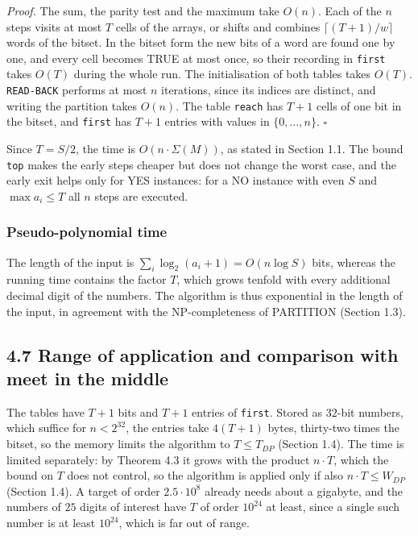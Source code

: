 \documentclass[
]{article}
\begin{document}
\emph{Proof.} The sum, the parity test and the maximum take \(O(n)\).
Each of the \(n\) steps visits at most \(T\) cells of the arrays, or
shifts and combines \(\lceil (T+1)/w \rceil\) words of the bitset. In
the bitset form the new bits of a word are found one by one, and every
cell becomes TRUE at most once, so their recording in \texttt{first}
takes \(O(T)\) during the whole run. The initialisation of both tables
takes \(O(T)\). \texttt{READ-BACK} performs at most \(n\) iterations,
since its indices are distinct, and writing the partition takes
\(O(n)\). The table \texttt{reach} has \(T + 1\) cells of one bit in the
bitset, and \texttt{first} has \(T + 1\) entries with values in
\(\lbrace 0, \dots, n \rbrace\). \(\square\)

Since \(T = S/2\), the time is \(O(n \cdot \Sigma(M))\), as stated in
Section 1.1. The bound \texttt{top} makes the early steps cheaper but
does not change the worst case, and the early exit helps only for YES
instances: for a NO instance with even \(S\) and \(\max a_i \le T\) all
\(n\) steps are executed.

\hypertarget{pseudo-polynomial-time}{%
\subsubsection{Pseudo-polynomial time}\label{pseudo-polynomial-time}}

The length of the input is \(\sum_i \log_2 (a_i + 1) = O(n \log S)\)
bits, whereas the running time contains the factor \(T\), which grows
tenfold with every additional decimal digit of the numbers. The
algorithm is thus exponential in the length of the input, in agreement
with the NP-completeness of PARTITION (Section 1.3).

\hypertarget{range-of-application-and-comparison-with-meet-in-the-middle}{%
\subsection{4.7 Range of application and comparison with meet in the
middle}\label{range-of-application-and-comparison-with-meet-in-the-middle}}

The tables have \(T + 1\) bits and \(T + 1\) entries of \texttt{first}.
Stored as \(32\)-bit numbers, which suffice for \(n < 2^{32}\), the
entries take \(4(T + 1)\) bytes, thirty-two times the bitset, so the
memory limits the algorithm to \(T \le T_{DP}\) (Section 1.4). The time
is limited separately: by Theorem 4.3 it grows with the product
\(n \cdot T\), which the bound on \(T\) does not control, so the
algorithm is applied only if also \(n \cdot T \le W_{DP}\) (Section
1.4). A target of order \(2.5 \cdot 10^8\) already needs about a
gigabyte, and the numbers of \(25\) digits of interest have \(T\) of
order \(10^{24}\) at least, since a single such number is at least
\(10^{24}\), which is far out of range.
\end{document}
